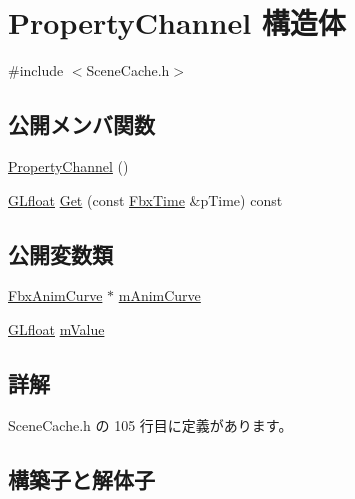 \hypertarget{struct_property_channel}{}\section{Property\+Channel 構造体}
\label{struct_property_channel}


{\ttfamily \#include $<$Scene\+Cache.\+h$>$}

\subsection*{公開メンバ関数}
\begin{DoxyCompactItemize}
\item 
\hyperlink{struct_property_channel_a26ab364655ae3521351e7462f9eace25}{Property\+Channel} ()
\item 
\hyperlink{glew_8h_a31aeedaeef29442c9c015ab355c8f5ab}{G\+Lfloat} \hyperlink{struct_property_channel_ad3ad08b01dc4816c8bd47609070018ce}{Get} (const \hyperlink{class_fbx_time}{Fbx\+Time} \&p\+Time) const
\end{DoxyCompactItemize}
\subsection*{公開変数類}
\begin{DoxyCompactItemize}
\item 
\hyperlink{class_fbx_anim_curve}{Fbx\+Anim\+Curve} $\ast$ \hyperlink{struct_property_channel_a2cdb65a9f9ace8380622e4a60f0fb835}{m\+Anim\+Curve}
\item 
\hyperlink{glew_8h_a31aeedaeef29442c9c015ab355c8f5ab}{G\+Lfloat} \hyperlink{struct_property_channel_af0146f683c4f9246f0ca414aeb7e8ce3}{m\+Value}
\end{DoxyCompactItemize}


\subsection{詳解}


 Scene\+Cache.\+h の 105 行目に定義があります。



\subsection{構築子と解体子}
\mbox{\label{struct_property_channel_a26ab364655ae3521351e7462f9eace25}} 
